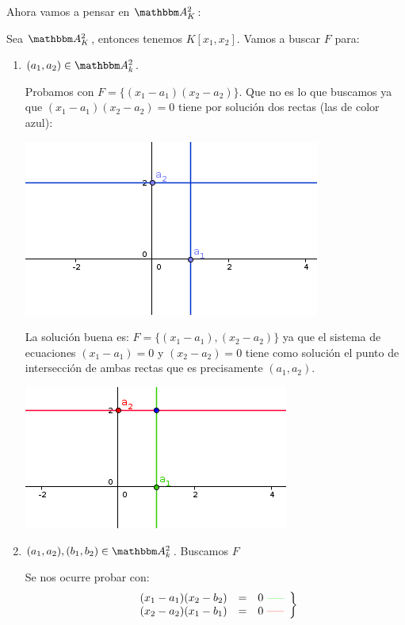 Ahora vamos a pensar en  $\A_K^2$:
\begin{example}	
	Sea $\A_K^2$, entonces tenemos $K[x_1,x_2]$. Vamos a buscar $F$ para:
	
	\begin{enumerate}
		\item $(a_1,a_2) \in \A^2_k$.
		
		Probamos con $F=\{(x_1-a_1)(x_2-a_2)\}$. Que no es lo que buscamos ya que $(x_1-a_1)(x_2-a_2)=0$ tiene por solución dos rectas (las de color azul):
		
		\begin{center}
			\includegraphics[scale=0.45]{img/ej1.png}
		\end{center}
		
		La solución buena es:  $F=\{(x_1-a_1),(x_2-a_2)\}$ ya que el sistema de ecuaciones $(x_1-a_1)=0$ y $(x_2-a_2)=0$ tiene como solución el punto de intersección de ambas rectas que es precisamente $(a_1,a_2)$.
		
		\begin{center}
			\includegraphics[scale=0.45]{img/ej2.png}
		\end{center}
		
		
		\item $(a_1,a_2),(b_1,b_2) \in \A^2_k$. Buscamos $F$
		
		Se nos ocurre probar con:
		\[
		\left.
		\begin{array}{rcl}
		(x_1-a_1)(x_2-b_2) & = & 0  \text{ \textcolor{green}{-----}}\\
		(x_2-a_2)(x_1-b_1) & = & 0 \text{ \textcolor{red}{-----}}
		\end{array}
		\right\}
		\]
		

\end{enumerate}
\end{example}
